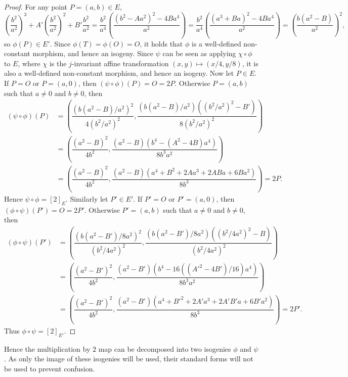 \documentclass{article}
\newcommand{\rb}[1]{\left( #1 \right)}
\renewcommand{\sb}[1]{\left[ #1 \right]}
\theoremstyle{definition}\newtheorem*{definition}{Definition}
\theoremstyle{definition}\newtheorem*{example}{Example}
\theoremstyle{definition}\newtheorem*{remark}{Remark}
\begin{document}
\begin{proof}
For any point $ P = \rb{a, b} \in E $,
$$ \rb{\dfrac{b^2}{a^2}}^3 + A'\rb{\dfrac{b^2}{a^2}}^2 + B'\dfrac{b^2}{a^2}
= \dfrac{b^2}{a^4}\rb{\dfrac{\rb{b^2 - Aa^2}^2 - 4Ba^4}{a^2}}
= \dfrac{b^2}{a^4}\rb{\dfrac{\rb{a^3 + Ba}^2 - 4Ba^4}{a^2}}
= \rb{\dfrac{b\rb{a^2 - B}}{a^2}}^2, $$
so $ \phi\rb{P} \in E' $. Since $ \phi\rb{T} = \phi\rb{O} = O $, it holds that $ \phi $ is a well-defined non-constant morphism, and hence an isogeny. Since $ \psi $ can be seen as applying $ \chi \circ \phi $ to $ E $, where $ \chi $ is the $ j $-invariant affine transformation $ \rb{x, y} \mapsto \rb{x / 4, y / 8} $, it is also a well-defined non-constant morphism, and hence an isogeny. Now let $ P \in E $. If $ P = O $ or $ P = \rb{a, 0} $, then $ \rb{\psi \circ \phi}\rb{P} = O = 2P $. Otherwise $ P = \rb{a, b} $ such that $ a \ne 0 $ and $ b \ne 0 $, then
\begin{align*}
\rb{\psi \circ \phi}\rb{P}
& = \rb{\dfrac{\rb{b\rb{a^2 - B} / a^2}^2}{4\rb{b^2 / a^2}^2}, \dfrac{\rb{b\rb{a^2 - B} / a^2}\rb{\rb{b^2 / a^2}^2 - B'}}{8\rb{b^2 / a^2}^2}} \\
& = \rb{\dfrac{\rb{a^2 - B}^2}{4b^2}, \dfrac{\rb{a^2 - B}\rb{b^4 - \rb{A^2 - 4B}a^4}}{8b^3a^2}} \\
& = \rb{\dfrac{\rb{a^2 - B}^2}{4b^2}, \dfrac{\rb{a^2 - B}\rb{a^4 + B^2 + 2Aa^3 + 2ABa + 6Ba^2}}{8b^3}} = 2P.
\end{align*}
Hence $ \psi \circ \phi = \sb{2}_E $. Similarly let $ P' \in E' $. If $ P' = O $ or $ P' = \rb{a, 0} $, then $ \rb{\phi \circ \psi}\rb{P'} = O = 2P' $. Otherwise $ P' = \rb{a, b} $ such that $ a \ne 0 $ and $ b \ne 0 $, then
\begin{align*}
\rb{\phi \circ \psi}\rb{P'}
& = \rb{\dfrac{\rb{b\rb{a^2 - B'} / 8a^2}^2}{\rb{b^2 / 4a^2}^2}, \dfrac{\rb{b\rb{a^2 - B'} / 8a^2}\rb{\rb{b^2 / 4a^2}^2 - B}}{\rb{b^2 / 4a^2}^2}} \\
& = \rb{\dfrac{\rb{a^2 - B'}^2}{4b^2}, \dfrac{\rb{a^2 - B'}\rb{b^4 - 16\rb{\rb{A'^2 - 4B'} / 16}a^4}}{8b^3a^2}} \\
& = \rb{\dfrac{\rb{a^2 - B'}^2}{4b^2}, \dfrac{\rb{a^2 - B'}\rb{a^4 + B'^2 + 2A'a^3 + 2A'B'a + 6B'a^2}}{8b^3}} = 2P'.
\end{align*}
Thus $ \phi \circ \psi = \sb{2}_{E'} $.
\end{proof}

Hence the multiplication by $ 2 $ map can be decomposed into two isogenies $ \phi $ and $ \psi $. As only the image of these isogenies will be used, their standard forms will not be used to prevent confusion.
\end{document}
